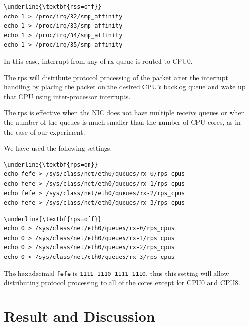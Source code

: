 \begin{Verbatim}[commandchars=\\\{\}]
\underline{\textbf{rss=off}}
echo 1 > /proc/irq/82/smp_affinity
echo 1 > /proc/irq/83/smp_affinity
echo 1 > /proc/irq/84/smp_affinity
echo 1 > /proc/irq/85/smp_affinity
\end{Verbatim}

In this case, interrupt from any of rx queue is routed to CPU0.

The rps will distribute protocol processing of the packet after the interrupt handling by placing the packet
on the desired CPU's backlog queue and wake up that CPU using inter-processor interrupts.

The rps is effective when the NIC does not have multiple receive queues or when the number of the queues is 
much smaller than the number of CPU cores, as in the case of our experiment.

We have used the following settings:

\begin{Verbatim}[commandchars=\\\{\}]
\underline{\textbf{rps=on}}
echo fefe > /sys/class/net/eth0/queues/rx-0/rps_cpus
echo fefe > /sys/class/net/eth0/queues/rx-1/rps_cpus
echo fefe > /sys/class/net/eth0/queues/rx-2/rps_cpus
echo fefe > /sys/class/net/eth0/queues/rx-3/rps_cpus
\end{Verbatim}

\begin{Verbatim}[commandchars=\\\{\}]
\underline{\textbf{rps=off}}
echo 0 > /sys/class/net/eth0/queues/rx-0/rps_cpus
echo 0 > /sys/class/net/eth0/queues/rx-1/rps_cpus
echo 0 > /sys/class/net/eth0/queues/rx-2/rps_cpus
echo 0 > /sys/class/net/eth0/queues/rx-3/rps_cpus
\end{Verbatim}

The hexadecimal {\tt fefe} is {\tt 1111 1110 1111 1110}, 
thus this setting will allow distributing protocol processing to all of the cores except for CPU0 and CPU8.

\section{Result and Discussion}\label{Result and Discussion}

